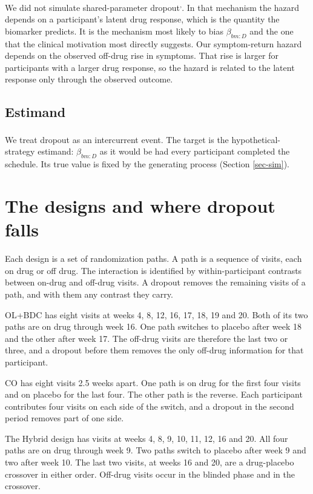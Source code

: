 \documentclass[
  11pt,
]{article}
\begin{document}
We did not simulate shared-parameter dropout\textsuperscript{,}. In that mechanism the hazard
depends on a participant's latent drug response, which is the quantity
the biomarker predicts. It is the mechanism most likely to bias
\(\beta_{bm:D}\) and the one that the clinical motivation most directly
suggests. Our symptom-return hazard depends on the observed
off-drug rise in symptoms. That rise is larger for participants with a
larger drug response, so the hazard is related to the latent response
only through the observed outcome.

\subsection{Estimand}\label{estimand}

We treat dropout as an intercurrent event\textsuperscript{}. The
target is the hypothetical-strategy estimand: \(\beta_{bm:D}\) as it
would be had every participant completed the schedule. Its true value
is fixed by the generating process (Section \ref{sec-sim}).

\section{The designs and where dropout falls}\label{sec-designs}

Each design is a set of randomization paths. A path is a sequence of
visits, each on drug or off drug. The interaction is identified by
within-participant contrasts between on-drug and off-drug visits. A
dropout removes the remaining visits of a path, and with them any
contrast they carry.

OL+BDC has eight visits at weeks 4, 8, 12, 16, 17, 18, 19 and 20.
Both of its two paths are on drug through week 16. One path switches
to placebo after week 18 and the other after week 17. The off-drug
visits are therefore the last two or three, and a dropout before them
removes the only off-drug information for that participant.

CO has eight visits 2.5 weeks apart. One path is on drug for the
first four visits and on placebo for the last four. The other path
is the reverse. Each participant contributes four visits on each side
of the switch, and a dropout in the second period removes part of one
side.

The Hybrid design has visits at weeks 4, 8, 9, 10, 11, 12, 16 and 20.
All four paths are on drug through week 9. Two paths switch to placebo
after week 9 and two after week 10. The last two visits, at weeks 16
and 20, are a drug-placebo crossover in either order. Off-drug visits
occur in the blinded phase and in the crossover.
\end{document}
